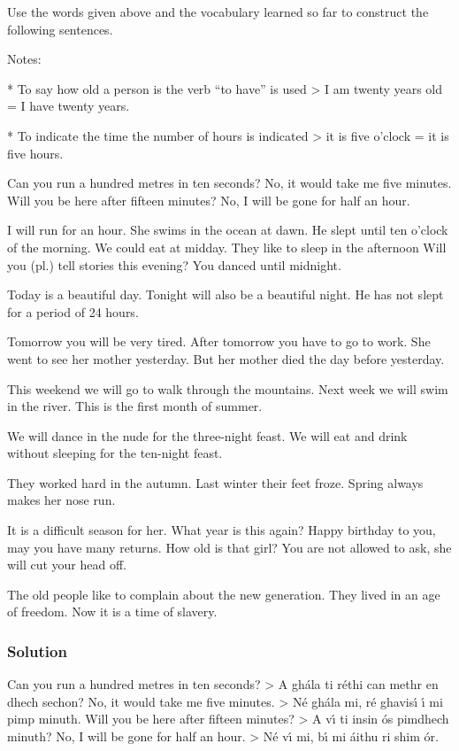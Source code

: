 Use the words given above and the vocabulary learned so far to construct the following sentences.

Notes: 

* To say how old a person is the verb “to have” is used > I am twenty years old = I have twenty years. 

* To indicate the time the number of hours is indicated > it is five o’clock = it is five hours.

Can you run a hundred metres in ten seconds?
No, it would take me five minutes.
Will you be here after fifteen minutes?
No, I will be gone for half an hour.

I will run for an hour.
She swims in the ocean at dawn.
He slept until ten o’clock of the morning.
We could eat at midday.
They like to sleep in the afternoon
Will you (pl.) tell stories this evening?
You danced until midnight.

Today is a beautiful day.
Tonight will also be a beautiful night.
He has not slept for a period of 24 hours.

Tomorrow you will be very tired.
After tomorrow you have to go to work.
She went to see her mother yesterday.
But her mother died the day before yesterday.

This weekend we will go to walk through the mountains.
Next week we will swim in the river.
This is the first month of summer.

We will dance in the nude for the three-night feast.
We will eat and drink without sleeping for the ten-night feast.

They worked hard in the autumn.
Last winter their feet froze.
Spring always makes her nose run.

It is a difficult season for her.
What year is this again?
Happy birthday to you, may you have many returns.
How old is that girl?
You are not allowed to ask, she will cut your head off.

The old people like to complain about the new generation.
They lived in an age of freedom.
Now it is a time of slavery.

\newpage
\subsubsection{Solution}

Can you run a hundred metres in ten seconds? > A gh\'{a}la ti r\'{e}thi can methr en dhech sechon?
No, it would take me five minutes. > N\'{e} gh\'{a}la mi, r\'{e} ghavis\'{\i} \'{\i} mi pimp minuth.
Will you be here after fifteen minutes? > A v\'{\i} ti insin \'{o}s pimdhech minuth?
No, I will be gone for half an hour. > N\'{e} v\'{\i} mi, b\'{\i} mi \'{a}ithu ri shim \'{o}r.

